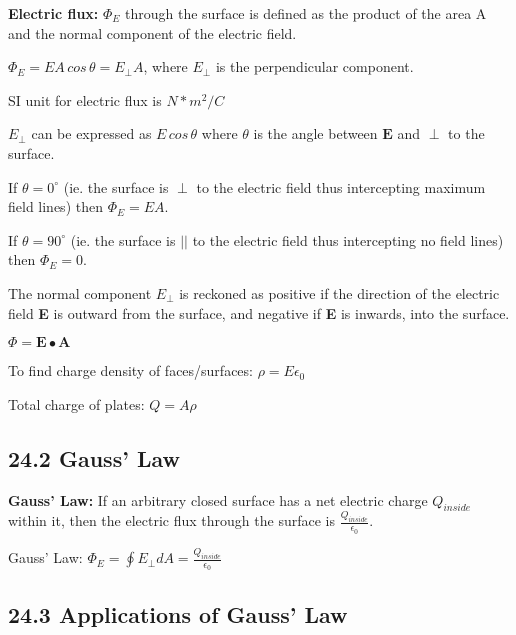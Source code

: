 \documentclass[twocolumn]{article}
\newenvironment{small_item}{
\begin{itemize}
  \setlength{\itemsep}{.25pt}
  \setlength{\parskip}{0pt}
  \setlength{\parsep}{0pt}
}{\end{itemize}}
\begin{document}
	\begin{small_item}
		\item \textbf{Electric flux:} $\Phi_E$ through the surface is defined as the product of the area A and the normal component of the electric field.
		\item $\Phi_E = EA\,cos\,\theta = E_\perp A$, where $E_\perp$ is the perpendicular component.
		\item SI unit for electric flux is $N*m^2/C$
		\item $E_\perp$ can be expressed as $E\,cos\,\theta$ where $\theta$ is the angle between $\mathbf{E}$ and $\perp$ to the surface.
		\item If $\theta = 0^\circ$ (ie. the surface is $\perp$ to the electric field thus intercepting maximum field lines) then $\Phi_E = EA$.
		\item If $\theta = 90^\circ$ (ie. the surface is $||$ to the electric field thus intercepting no field lines) then $\Phi_E = 0$.
		\item The normal component $E_\perp$ is reckoned as positive if the direction of the electric field \textbf{E} is outward from the surface, and negative if \textbf{E} is inwards, into the surface.
		\item $\Phi = \mathbf{E}\bullet \mathbf{A}$
		\item To find charge density of faces/surfaces: $\rho = E \epsilon_0$
		\item Total charge of plates: $Q = A \rho$
	\end{small_item}
	
	
	\subsection*{24.2 Gauss' Law} %
	\label{sub:24_2_gauss_law}
	
	\begin{small_item}
		\item \textbf{Gauss' Law:} If an arbitrary closed surface has a net electric charge $Q_{inside}$ within it, then the electric flux through the surface is $\frac{Q_{inside}}{\epsilon_0}$.
		\item Gauss' Law: $\Phi_E = \oint E_\perp dA = \frac{Q_{inside}}{\epsilon_0}$
	\end{small_item}
	
	
	\subsection*{24.3 Applications of Gauss' Law} %
	\label{sub:24_3_applications_of_gauss_law}
	
\end{document}
